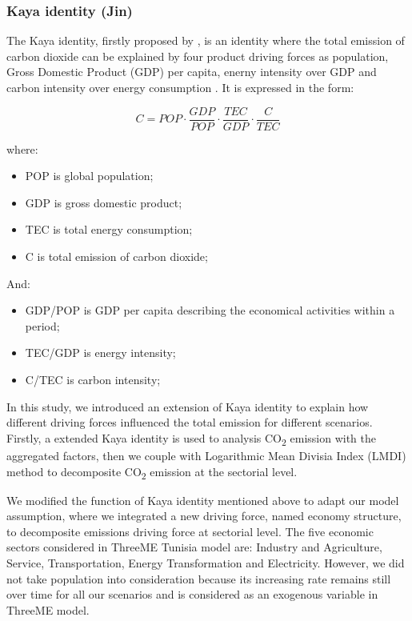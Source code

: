 \documentclass[
]{article}
\providecommand{\tightlist}{%
  \setlength{\itemsep}{0pt}\setlength{\parskip}{0pt}}
\begin{document}
\hypertarget{kaya-identity-jin}{%
\subsubsection{Kaya identity (Jin)}\label{kaya-identity-jin}}

The Kaya identity, firstly proposed by \autocite{kaya1989}, is an
identity where the total emission of carbon dioxide can be explained by
four product driving forces as population, Gross Domestic Product (GDP)
per capita, enerny intensity over GDP and carbon intensity over energy
consumption \autocite{kayaide2021}. It is expressed in the form:

\[ C = POP \cdot \frac{GDP}{POP} \cdot \frac{TEC}{GDP} \cdot \frac{C}{TEC} \tag{1}\]

where:

\begin{itemize}
\tightlist
\item
  POP is global population;
\item
  GDP is gross domestic product;
\item
  TEC is total energy consumption;
\item
  C is total emission of carbon dioxide;
\end{itemize}

And:

\begin{itemize}
\tightlist
\item
  GDP/POP is GDP per capita describing the economical activities within
  a period;
\item
  TEC/GDP is energy intensity;
\item
  C/TEC is carbon intensity;
\end{itemize}

In this study, we introduced an extension of Kaya identity to explain
how different driving forces influenced the total emission for different
scenarios. Firstly, a extended Kaya identity is used to analysis
CO\textsubscript{2} emission with the aggregated factors, then we couple
with Logarithmic Mean Divisia Index (LMDI) method to decomposite
CO\textsubscript{2} emission at the sectorial level.

We modified the function of Kaya identity mentioned above to adapt our
model assumption, where we integrated a new driving force, named economy
structure, to decomposite emissions driving force at sectorial level.
The five economic sectors considered in ThreeME Tunisia model are:
Industry and Agriculture, Service, Transportation, Energy Transformation
and Electricity. However, we did not take population into consideration
because its increasing rate remains still over time for all our
scenarios and is considered as an exogenous variable in ThreeME model.
\end{document}
